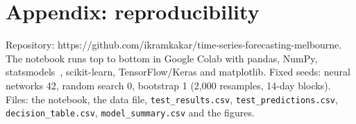\documentclass[11pt,a4paper]{article}
\newcommand{\GitHub}{https://github.com/ikramkakar/time-series-forecasting-melbourne}
\begin{document}
\section*{Appendix: reproducibility}
Repository: \GitHub. The notebook runs top to bottom in Google Colab with pandas, NumPy, statsmodels~\cite{statsmodels}, scikit-learn, TensorFlow/Keras and matplotlib. Fixed seeds: neural networks 42, random search 0, bootstrap 1 (2,000 resamples, 14-day blocks). Files: the notebook, the data file, \texttt{test\_results.csv}, \texttt{test\_predictions.csv}, \texttt{decision\_table.csv}, \texttt{model\_summary.csv} and the figures.
\end{document}

